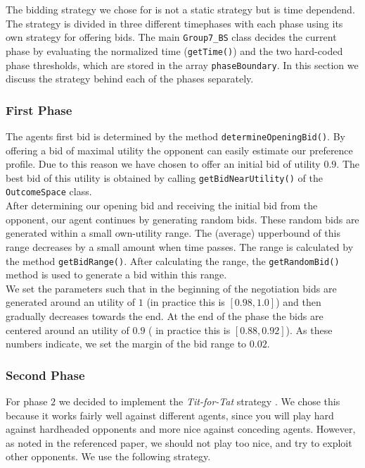 The bidding strategy we chose for is not a static strategy but is time dependend. The strategy is divided in three different timephases with each phase using its own strategy for offering bids. The main \texttt{Group7\_BS} class decides the current phase by evaluating the normalized time (\texttt{getTime()}) and the two hard-coded phase thresholds, which are stored in the array \texttt{phaseBoundary}. In this section we discuss the strategy behind each of the phases separately.

\subsubsection{First Phase}
The agents first bid is determined by the method \texttt{determineOpeningBid()}. By offering a bid of maximal utility the opponent can easily estimate our preference profile. Due to this reason we have chosen to offer an initial bid of utility $0.9$. The best bid of this utility is obtained by calling \texttt{getBidNearUtility()} of the \texttt{OutcomeSpace} class. \\

After determining our opening bid and receiving the initial bid from the opponent, our agent continues by generating random bids. These random bids are generated within a small own-utility range. The (average) upperbound of this range decreases by a small amount when time passes. The range is calculated by the method \texttt{getBidRange()}. After calculating the range, the \texttt{getRandomBid()} method is used to generate a bid within this range. \\

We set the parameters such that in the beginning of the negotiation bids are generated around an utility of $1$ (in practice this is $[0.98, 1.0]$) and then gradually decreases towards the end. At the end of the phase the bids are centered around an utility of $0.9$ ( in practice this is $[0.88, 0.92]$). As these numbers indicate, we set the margin of the bid range to $0.02$. 


\subsubsection{Second Phase}

For phase $2$ we decided to implement the \emph{Tit-for-Tat} strategy \cite{titfortat}.
We chose this because it works fairly well against different agents, since you will play
hard against hardheaded opponents and more nice against conceding agents.
However, as noted in the referenced paper, we should not play too nice,
and try to exploit other opponents. We use the following strategy. \\


